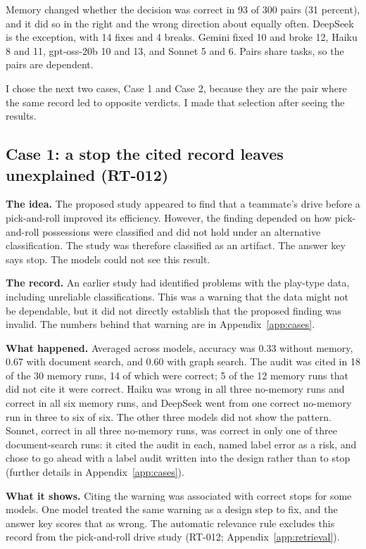 \documentclass[11pt]{article}
\begin{document}
Memory changed whether the decision was correct in 93 of 300 pairs (31 percent), and it did so in the right and the wrong direction about equally often. DeepSeek is the exception, with 14 fixes and 4 breaks. Gemini fixed 10 and broke 12, Haiku 8 and 11, gpt-oss-20b 10 and 13, and Sonnet 5 and 6. Pairs share tasks, so the pairs are dependent.

I chose the next two cases, Case 1 and Case 2, because they are the pair where the same record led to opposite verdicts. I made that selection after seeing the results.

\subsection{Case 1: a stop the cited record leaves unexplained (RT-012)}
\label{sec:rt012}

\textbf{The idea.} The proposed study appeared to find that a teammate's drive before a pick-and-roll improved its efficiency. However, the finding depended on how pick-and-roll possessions were classified and did not hold under an alternative classification. The study was therefore classified as an artifact. The answer key says stop. The models could not see this result.

\textbf{The record.} An earlier study had identified problems with the play-type data, including unreliable classifications. This was a warning that the data might not be dependable, but it did not directly establish that the proposed finding was invalid. The numbers behind that warning are in Appendix~\ref{app:cases}.

\textbf{What happened.} Averaged across models, accuracy was 0.33 without memory, 0.67 with document search, and 0.60 with graph search. The audit was cited in 18 of the 30 memory runs, 14 of which were correct; 5 of the 12 memory runs that did not cite it were correct. Haiku was wrong in all three no-memory runs and correct in all six memory runs, and DeepSeek went from one correct no-memory run in three to six of six. The other three models did not show the pattern. Sonnet, correct in all three no-memory runs, was correct in only one of three document-search runs: it cited the audit in each, named label error as a risk, and chose to go ahead with a label audit written into the design rather than to stop (further details in Appendix~\ref{app:cases}).

\textbf{What it shows.} Citing the warning was associated with correct stops for some models. One model treated the same warning as a design step to fix, and the answer key scores that as wrong. The automatic relevance rule excludes this record from the pick-and-roll drive study (RT-012; Appendix~\ref{app:retrieval}).
\end{document}
